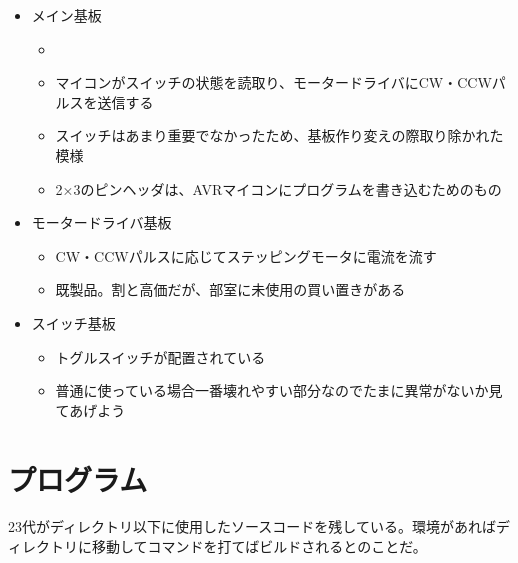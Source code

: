 \documentclass[letterpaper,10pt,dvipdfmx]{sphinxmanual}
\begin{document}
\begin{itemize}
\item {} 
メイン基板
\begin{itemize}
\item {} 

\item {} 
マイコンがスイッチの状態を読取り、モータードライバにCW・CCWパルスを送信する

\item {} 
スイッチはあまり重要でなかったため、基板作り変えの際取り除かれた模様

\item {} 
2×3のピンヘッダは、AVRマイコンにプログラムを書き込むためのもの

\end{itemize}

\item {} 
モータードライバ基板
\begin{itemize}
\item {} 
CW・CCWパルスに応じてステッピングモータに電流を流す

\item {} 
既製品。割と高価だが、部室に未使用の買い置きがある

\end{itemize}

\item {} 
スイッチ基板
\begin{itemize}
\item {} 
トグルスイッチが配置されている

\item {} 
普通に使っている場合一番壊れやすい部分なのでたまに異常がないか見てあげよう

\end{itemize}

\end{itemize}


\section{プログラム}
\label{\detokenize{nissyu-idohen/saitama:}}\label{\detokenize{nissyu-idohen/saitama:id6}}
23代がディレクトリ以下に使用したソースコードを残している。環境があればディレクトリに移動してコマンドを打てばビルドされるとのことだ。
\end{document}
